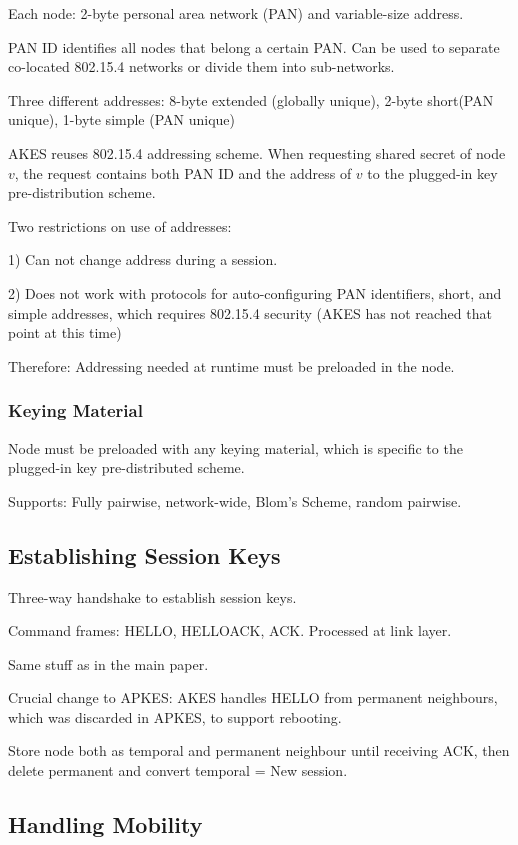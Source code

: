 \documentclass[10pt]{article}
\begin{document}
Each node: 2-byte personal area network (PAN) and variable-size address.

PAN ID identifies all nodes that belong a certain PAN. Can be used to separate co-located 802.15.4 networks or divide them into sub-networks.

Three different addresses: 8-byte extended (globally unique), 2-byte short(PAN unique), 1-byte simple (PAN unique)

AKES reuses 802.15.4 addressing scheme. When requesting shared secret of node $v$, the request contains both PAN ID and the address of $v$ to the plugged-in key pre-distribution scheme.

Two restrictions on use of addresses:

1) Can not change address during a session.

2) Does not work with protocols for auto-configuring PAN identifiers, short, and simple addresses, which requires 802.15.4 security (AKES has not reached that point at this time)

Therefore: Addressing needed at runtime must be preloaded in the node.

\subsubsection{Keying Material}

Node must be preloaded with any keying material, which is specific to the plugged-in key pre-distributed scheme.

Supports: Fully pairwise, network-wide, Blom's Scheme, random pairwise.

\subsection{Establishing Session Keys}

Three-way handshake to establish session keys.

Command frames: HELLO, HELLOACK, ACK. Processed at link layer.

Same stuff as in the main paper.

Crucial change to APKES: AKES handles HELLO from permanent neighbours, which was discarded in APKES, to support rebooting.

Store node both as temporal and permanent neighbour until receiving ACK, then delete permanent and convert temporal = New session.

\subsection{Handling Mobility}
\end{document}
